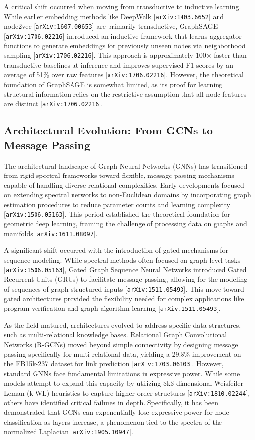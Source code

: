 \documentclass[11pt]{article}
\begin{document}
A critical shift occurred when moving from transductive to inductive learning. While earlier embedding methods like DeepWalk [\texttt{arXiv:1403.6652}] and node2vec [\texttt{arXiv:1607.00653}] are primarily transductive, GraphSAGE [\texttt{arXiv:1706.02216}] introduced an inductive framework that learns aggregator functions to generate embeddings for previously unseen nodes via neighborhood sampling [\texttt{arXiv:1706.02216}]. This approach is approximately 100× faster than transductive baselines at inference and improves supervised F1-scores by an average of 51\% over raw features [\texttt{arXiv:1706.02216}]. However, the theoretical foundation of GraphSAGE is somewhat limited, as its proof for learning structural information relies on the restrictive assumption that all node features are distinct [\texttt{arXiv:1706.02216}].

\subsection{Architectural Evolution: From GCNs to Message Passing}

The architectural landscape of Graph Neural Networks (GNNs) has transitioned from rigid spectral frameworks toward flexible, message-passing mechanisms capable of handling diverse relational complexities. Early developments focused on extending spectral networks to non-Euclidean domains by incorporating graph estimation procedures to reduce parameter counts and learning complexity [\texttt{arXiv:1506.05163}]. This period established the theoretical foundation for geometric deep learning, framing the challenge of processing data on graphs and manifolds [\texttt{arXiv:1611.08097}].

A significant shift occurred with the introduction of gated mechanisms for sequence modeling. While spectral methods often focused on graph-level tasks [\texttt{arXiv:1506.05163}], Gated Graph Sequence Neural Networks introduced Gated Recurrent Units (GRUs) to facilitate message passing, allowing for the modeling of sequences of graph-structured inputs [\texttt{arXiv:1511.05493}]. This move toward gated architectures provided the flexibility needed for complex applications like program verification and graph algorithm learning [\texttt{arXiv:1511.05493}].

As the field matured, architectures evolved to address specific data structures, such as multi-relational knowledge bases. Relational Graph Convolutional Networks (R-GCNs) moved beyond simple connectivity by designing message passing specifically for multi-relational data, yielding a 29.8\% improvement on the FB15k-237 dataset for link prediction [\texttt{arXiv:1703.06103}]. However, standard GNNs face fundamental limitations in expressive power. While some models attempt to expand this capacity by utilizing \$k\$-dimensional Weisfeiler-Leman (k-WL) heuristics to capture higher-order structures [\texttt{arXiv:1810.02244}], others have identified critical failures in depth. Specifically, it has been demonstrated that GCNs can exponentially lose expressive power for node classification as layers increase, a phenomenon tied to the spectra of the normalized Laplacian [\texttt{arXiv:1905.10947}].
\end{document}
